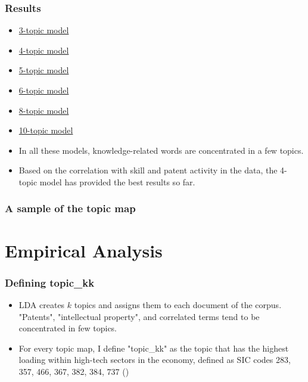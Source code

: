 \documentclass{beamer}
\newcommand{\ffo}{dicfullmc10thr10defnob40noa1_4t}
\begin{document}
\begin{frame}
  \frametitle{Results}
  \label{results}
  \begin{itemize}
  \item   \href{https://htmlpreview.github.io/?https://github.com/pbrazval/LDA_10Ks/blob/main/dicfullmc10thr10defnob5noa0_8_3t.html}{3-topic model}
  \item   \href{https://htmlpreview.github.io/?https://github.com/pbrazval/LDA_10Ks/blob/main/dicfullmc10thr10defnob5noa0_8_4t.html}{4-topic model}
  \item   \href{https://htmlpreview.github.io/?https://github.com/pbrazval/LDA_10Ks/blob/main/dicfullmc10thr10defnob5noa0_8_5t.html}{5-topic model}
  \item   \href{https://htmlpreview.github.io/?https://github.com/pbrazval/LDA_10Ks/blob/main/dicfullmc10thr10defnob5noa0_8_6t.html}{6-topic model}
  \item   \href{https://htmlpreview.github.io/?https://github.com/pbrazval/LDA_10Ks/blob/main/dicfullmc10thr10defnob5noa0_8_8t.html}{8-topic model}
  \item   \href{https://htmlpreview.github.io/?https://github.com/pbrazval/LDA_10Ks/blob/main/dicfullmc10thr10defnob5noa0_8_10t.html}{10-topic model}
  \item In all these models, knowledge-related words are concentrated in a few topics. 
  \item Based on the correlation with skill and patent activity in the data, the 4-topic model has provided the best results so far.   \hyperlink{meantiy_details}{}\hyperlink{robthree}{}\hyperlink{robsix}{}
\end{itemize}
\end{frame}


\begin{frame}
  \frametitle{A sample of the topic map}
   \tiny
  
\end{frame}


\section{Empirical Analysis}

\begin{frame}
  \frametitle{Defining topic\_kk}
  \begin{itemize}
  \item LDA creates $k$ topics and assigns them to each document of the corpus. "Patents", "intellectual property", and correlated terms tend to be concentrated in few topics.
  \item For every topic map, I define "topic\_kk" as the topic that has the highest loading within high-tech sectors in the economy, defined as SIC codes 283, 357, 466, 367, 382, 384, 737 (\cite{Brown2009-zp}) 
  
\end{itemize}

\end{frame}
\end{document}
